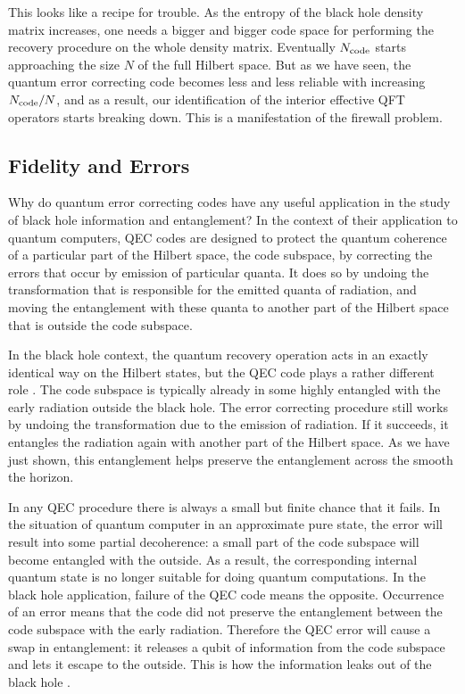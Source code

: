 \documentclass[12pt]{article}%
\begin{document}
This looks like a recipe for trouble. As the entropy of the black hole density matrix increases, one needs a bigger and bigger code space for 
performing the recovery procedure on the whole density matrix. Eventually ${N_{\rm code}}$ starts approaching the size $N$ of the full Hilbert 
space. But as we have seen, the quantum error correcting code becomes less and less 
reliable with increasing ${N_{\rm code}}/N$, and as a result, our identification of the interior effective QFT operators starts breaking down. 
This is a manifestation of the firewall problem.



\subsection{Fidelity and Errors}
\vspace{-2mm}

  Why do quantum error correcting codes have any useful application in the study of black hole information and entanglement?
In the context of their application to quantum computers, QEC codes are designed to protect the quantum coherence of a particular part of the Hilbert space, the code subspace, 
by correcting the errors that occur by emission of particular quanta. It does so by undoing the transformation that is responsible for the emitted quanta of radiation,  and moving the entanglement with these quanta to another part of the Hilbert space that is outside the code subspace. 

In the black hole context, the quantum  recovery operation acts in an exactly identical way on the Hilbert states, but the QEC code plays a rather different role \cite{haydenpreskill}. 
The code subspace  is  typically already in some highly entangled with  the early radiation outside the black hole. The error correcting procedure still works by undoing the transformation due to the emission of radiation. If it succeeds, it entangles the radiation again with another part of the Hilbert space. As we
have just shown, this entanglement helps preserve the entanglement across  the smooth the horizon.

In any QEC procedure there is always a small but finite chance that it fails. In the situation of  quantum computer in an approximate pure state,
the error will result into some partial decoherence: a small part of the code subspace will  become entangled with the outside. As a result, the corresponding 
internal quantum state  is no longer suitable for doing quantum computations. In the black hole application, failure of the QEC code means the opposite. Occurrence of an error
means that the code did not preserve the entanglement between the code subspace with the early radiation. Therefore the QEC error will cause a swap in entanglement:
it releases a qubit of information from the code subspace  and lets it escape to the outside. This is how the information leaks out of the black hole \cite{haydenpreskill}.
\end{document}

